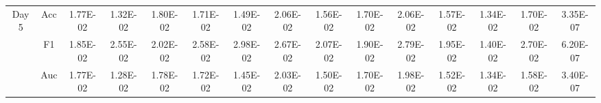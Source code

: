 \begin{table}[tb]
{\begin{tabular}{|c|c|c|c|c|c|c|c|c|c|c|c|c|c|c|}
            \multirow{3}{*}{ Day 5} & Acc        & 1.77E-02                 & 1.32E-02                 & 1.80E-02                & 1.71E-02                   & 1.49E-02 & 2.06E-02   & 1.56E-02       & 1.70E-02 & 2.06E-02   & 1.57E-02       & 1.34E-02 & 1.70E-02   & 3.35E-07 \\
                                    & F1         & 1.85E-02                 & 2.55E-02                 & 2.02E-02                & 2.58E-02                   & 2.98E-02 & 2.67E-02   & 2.07E-02       & 1.90E-02 & 2.79E-02   & 1.95E-02       & 1.40E-02 & 2.70E-02   & 6.20E-07 \\
                                    & Auc        & 1.77E-02                 & 1.28E-02                 & 1.78E-02                & 1.72E-02                   & 1.45E-02 & 2.03E-02   & 1.50E-02       & 1.70E-02 & 1.98E-02   & 1.52E-02       & 1.34E-02 & 1.58E-02   & 3.40E-07 \\
            \hline
        \end{tabular}}

        \label{tab:VARIANCE COMPARISON}
    \end{table}
    
